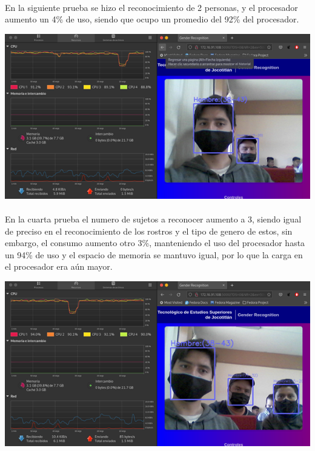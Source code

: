 \documentclass[9pt]{report}
\newenvironment{Figura}
  {\par\medskip\noindent\minipage{\linewidth}}
  {\endminipage\par\medskip}
\begin{document}
\begin{multicols}{2}
	\paragraph{}
	En la siguiente prueba se hizo el reconocimiento de 2 personas, y el procesador aumento un 4\% de uso, siendo que ocupo un promedio del 92\% del procesador.
	\begin{Figura}
		\includegraphics[width=\textwidth]{9}
		\label{figura10}
	\end{Figura}
	\paragraph{}
	En la cuarta prueba el numero de sujetos a reconocer aumento a 3, siendo igual de preciso en el reconocimiento de los rostros y el tipo de genero de estos, sin embargo, el consumo aumento otro 3\%, manteniendo el uso del procesador hasta un 94\% de uso y el espacio de memoria se mantuvo igual, por lo que la carga en el procesador era aún mayor.
	\begin{Figura}
		\includegraphics[width=\textwidth]{10}
		\label{figura11}
	\end{Figura}

\end{multicols}
\end{document}
